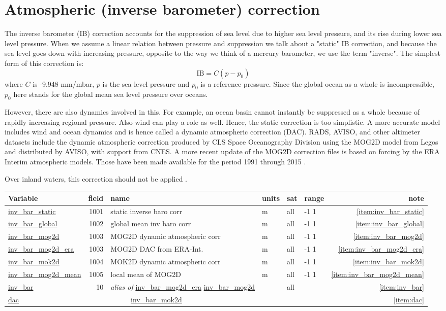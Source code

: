 \documentclass[a4paper,11pt,openany,natbib,nomargin]{thesis}
\makeatletter
\newcommand\var[1]{\url{#1}\index{variables!#1@\protect\url{#1}}}
\newcommand\alias[1]{\emph{alias of} \var{#1}}
\newenvironment{vartable}{
\begin{table}[ht]
\small
\begin{tabular}{lrllllr}
\hline
Variable & field & name & units & sat & range & note \\
\hline
}{
\hline
\end{tabular}
\end{table}
}
\makeatother
\begin{document}
\section{Atmospheric (inverse barometer) correction}
The inverse barometer (IB) correction accounts for the suppression of sea level due to higher sea level pressure, and its rise during lower sea level pressure. When we assume a linear relation between pressure and suppression we talk about a "static" IB correction, and because the sea level goes down with increasing pressure, opposite to the way we think of a mercury barometer, we use the term "inverse". The simplest form of this correction is:
$$ \mathrm{IB} = C (p - p_0) $$
where $C$ is -9.948 mm/mbar, $p$ is the sea level pressure and $p_0$ is a reference pressure. Since the global ocean as a whole is incompressible, $p_0$ here stands for the global mean sea level pressure over oceans.

However, there are also dynamics involved in this. For example, an ocean basin cannot instantly be suppressed as a whole because of rapidly increasing regional pressure. Also wind can play a role as well. Hence, the static correction is too simplistic. A more accurate model includes wind and ocean dynamics and is hence called a dynamic atmospheric correction (DAC). RADS, AVISO, and other altimeter datasets include the dynamic atmospheric correction produced by CLS Space Oceanography Division using the MOG2D model from Legos \citep{carrere2003,roblou2008a} and distributed by AVISO, with support from CNES.
A more recent update of the MOG2D correction files is based on forcing by the ERA Interim atmospheric models. Those have been made available for the period 1991 through 2015 \citep{carrere2016}.

Over inland waters, this correction should not be applied \citep{cretaux2006}.

\begin{vartable}
\var{inv_bar_static} & 1001 & static inverse baro corr & m & all & -1 1 & \ref{item:inv_bar_static} \\
\var{inv_bar_global} & 1002 & global mean inv baro corr & m & all & -1 1 & \ref{item:inv_bar_global} \\
\var{inv_bar_mog2d}  & 1003 & MOG2D dynamic atmospheric corr & m & all & -1 1 & \ref{item:inv_bar_mog2d} \\
\var{inv_bar_mog2d_era}  & 1003 & MOG2D DAC from ERA-Int. & m & all & -1 1 & \ref{item:inv_bar_mog2d_era} \\
\var{inv_bar_mok2d}  & 1004 & MOK2D dynamic atmospheric corr & m & all & -1 1 & \ref{item:inv_bar_mok2d} \\
\var{inv_bar_mog2d_mean} & 1005 & local mean of MOG2D & m & all & -1 1 & \ref{item:inv_bar_mog2d_mean} \\
\hline
\var{inv_bar} & 10 & \alias{inv_bar_mog2d_era} \var{inv_bar_mog2d} & & all & & \ref{item:inv_bar} \\
\var{dac} && ~~~~~ \var{inv_bar_mok2d} & & & & \ref{item:dac} \\
\end{vartable}
\end{document}
